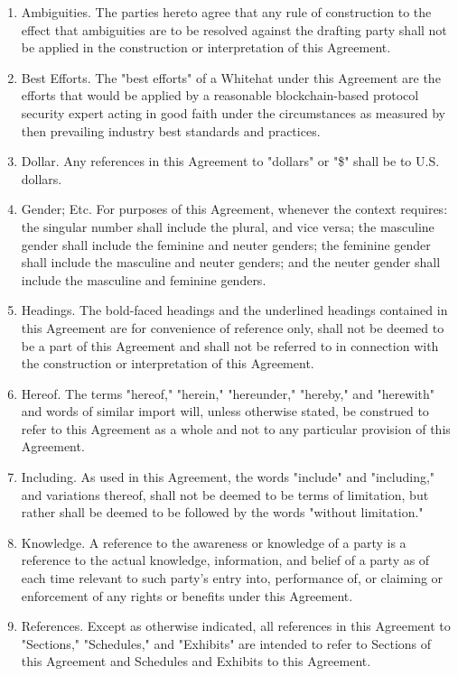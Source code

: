 \documentclass{article}
\begin{document}
\begin{enumerate}
    \item Ambiguities. The parties hereto agree that any rule of construction to the effect that ambiguities are to be resolved against the drafting party shall not be applied in the construction or interpretation of this Agreement.

    \item Best Efforts. The "best efforts" of a Whitehat under this Agreement are the efforts that would be applied by a reasonable blockchain-based protocol security expert acting in good faith under the circumstances as measured by then prevailing industry best standards and practices.

    \item Dollar. Any references in this Agreement to "dollars" or "\$" shall be to U.S. dollars.

    \item Gender; Etc. For purposes of this Agreement, whenever the context requires: the singular number shall include the plural, and vice versa; the masculine gender shall include the feminine and neuter genders; the feminine gender shall include the masculine and neuter genders; and the neuter gender shall include the masculine and feminine genders.

    \item Headings. The bold-faced headings and the underlined headings contained in this Agreement are for convenience of reference only, shall not be deemed to be a part of this Agreement and shall not be referred to in connection with the construction or interpretation of this Agreement.

    \item Hereof. The terms "hereof," "herein," "hereunder," "hereby," and "herewith" and words of similar import will, unless otherwise stated, be construed to refer to this Agreement as a whole and not to any particular provision of this Agreement.

    \item Including. As used in this Agreement, the words "include" and "including," and variations thereof, shall not be deemed to be terms of limitation, but rather shall be deemed to be followed by the words "without limitation."

    \item Knowledge. A reference to the awareness or knowledge of a party is a reference to the actual knowledge, information, and belief of a party as of each time relevant to such party's entry into, performance of, or claiming or enforcement of any rights or benefits under this Agreement.

    \item References. Except as otherwise indicated, all references in this Agreement to "Sections," "Schedules," and "Exhibits" are intended to refer to Sections of this Agreement and Schedules and Exhibits to this Agreement.
\end{enumerate}
\end{document}
